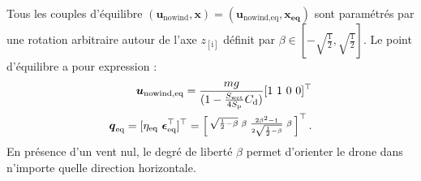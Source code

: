         Tous les couples d'équilibre $(\boldsymbol{u}_{\text{nowind}}, \boldsymbol{x}) = (\boldsymbol{u}_{\text{nowind},\text{eq}}, \boldsymbol{x_{\text{eq}}})$ sont paramétrés par une rotation arbitraire autour de l'axe $z_{[\text{i}]}$ définit par $\beta \in \left[-\sqrt{\frac{1}{2}},\sqrt{\frac{1}{2}}\right]$. Le point d'équilibre a pour expression :
        \begin{subequations}
            \label{eq:equilibria}
            \begin{align}
                \label{eq:bar_u}
                \boldsymbol{u}_{\text{nowind},\text{eq}} = \frac{mg}{( 1-\frac{S_{\text{wet}}}{4S_{\text{p}}} C_{\text{d}})} [1~1~0~0]^\top\\
                \boldsymbol{q}_{\text{eq}} = [\eta_{\text{eq}} ~\boldsymbol{\epsilon}_{\text{eq}}^\top]^\top = \left[ \begin{smallmatrix}\sqrt{\frac{1}{2}-\beta} & \beta & \frac{2\beta^{2}-1}{2\sqrt{\frac{1}{2}-\beta}} & \beta \end{smallmatrix} \right]^\top.
            \end{align}
        \end{subequations}
        En présence d'un vent nul, le degré de liberté $\beta$ permet d'orienter le drone dans n'importe quelle direction horizontale.

